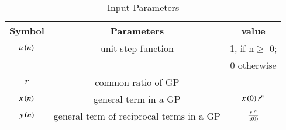 \setlength{\arrayrulewidth}{0.2mm}
\setlength{\tabcolsep}{15pt}
\renewcommand{\arraystretch}{1.15}


\begin{table}[ht]
  \centering
  \begin{tabular}{|c|c|c|}
    \hline
    	Symbol & Parameters & value\\
    \hline
	  $u\left(n\right)$ & unit step function & 1, if n$\geq$ 0; \\& &0 otherwise \\
    \hline
	  $r$ & common ratio of GP &  \\	  
    \hline
	  $x\left(n\right)$ & general term in a GP & $x\left(0\right) r^{n}$ \\
    \hline
	  $y\left(n\right)$ & general term of reciprocal terms in a GP & $\frac{r^{-n}}{x\left(0\right)}$ \\
	 	 
    \hline
  \end{tabular}
  \vspace{0.3cm}
  \caption{Input Parameters}
  \label{tab:24.11.9.5.14}
\end{table}
